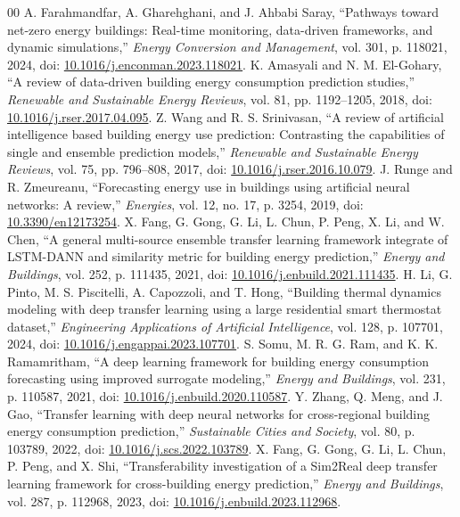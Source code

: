 \documentclass[conference]{IEEEtran}
\begin{document}
\begin{thebibliography}{00}
 A. Farahmandfar, A. Gharehghani, and J. Ahbabi Saray, ``Pathways toward net-zero energy buildings: Real-time monitoring, data-driven frameworks, and dynamic simulations,'' \textit{Energy Conversion and Management}, vol. 301, p. 118021, 2024, doi: \href{https://doi.org/10.1016/j.enconman.2023.118021}{10.1016/j.enconman.2023.118021}.
 K. Amasyali and N. M. El-Gohary, ``A review of data-driven building energy consumption prediction studies,'' \textit{Renewable and Sustainable Energy Reviews}, vol. 81, pp. 1192--1205, 2018, doi: \href{https://doi.org/10.1016/j.rser.2017.04.095}{10.1016/j.rser.2017.04.095}.
 Z. Wang and R. S. Srinivasan, ``A review of artificial intelligence based building energy use prediction: Contrasting the capabilities of single and ensemble prediction models,'' \textit{Renewable and Sustainable Energy Reviews}, vol. 75, pp. 796--808, 2017, doi: \href{https://doi.org/10.1016/j.rser.2016.10.079}{10.1016/j.rser.2016.10.079}.
 J. Runge and R. Zmeureanu, ``Forecasting energy use in buildings using artificial neural networks: A review,'' \textit{Energies}, vol. 12, no. 17, p. 3254, 2019, doi: \href{https://doi.org/10.3390/en12173254}{10.3390/en12173254}.
 X. Fang, G. Gong, G. Li, L. Chun, P. Peng, X. Li, and W. Chen, ``A general multi-source ensemble transfer learning framework integrate of LSTM-DANN and similarity metric for building energy prediction,'' \textit{Energy and Buildings}, vol. 252, p. 111435, 2021, doi: \href{https://doi.org/10.1016/j.enbuild.2021.111435}{10.1016/j.enbuild.2021.111435}.
 H. Li, G. Pinto, M. S. Piscitelli, A. Capozzoli, and T. Hong, ``Building thermal dynamics modeling with deep transfer learning using a large residential smart thermostat dataset,'' \textit{Engineering Applications of Artificial Intelligence}, vol. 128, p. 107701, 2024, doi: \href{https://doi.org/10.1016/j.engappai.2023.107701}{10.1016/j.engappai.2023.107701}.
 S. Somu, M. R. G. Ram, and K. K. Ramamritham, ``A deep learning framework for building energy consumption forecasting using improved surrogate modeling,'' \textit{Energy and Buildings}, vol. 231, p. 110587, 2021, doi: \href{https://doi.org/10.1016/j.enbuild.2020.110587}{10.1016/j.enbuild.2020.110587}.
 Y. Zhang, Q. Meng, and J. Gao, ``Transfer learning with deep neural networks for cross-regional building energy consumption prediction,'' \textit{Sustainable Cities and Society}, vol. 80, p. 103789, 2022, doi: \href{https://doi.org/10.1016/j.scs.2022.103789}{10.1016/j.scs.2022.103789}.
 X. Fang, G. Gong, G. Li, L. Chun, P. Peng, and X. Shi, ``Transferability investigation of a Sim2Real deep transfer learning framework for cross-building energy prediction,'' \textit{Energy and Buildings}, vol. 287, p. 112968, 2023, doi: \href{https://doi.org/10.1016/j.enbuild.2023.112968}{10.1016/j.enbuild.2023.112968}.

\end{thebibliography}
\end{document}
